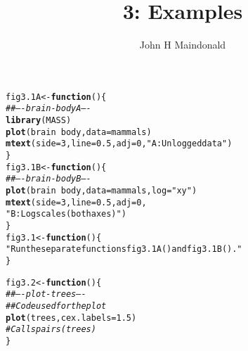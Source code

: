 \documentclass[12pt, a4paper,  BCOR=8.25mm, DIV=15]{scrartcl}\usepackage[]{graphicx}\usepackage[]{color}
\makeatletter
\newcommand{\hlnum}[1]{\textcolor[rgb]{0.686,0.059,0.569}{#1}}%
\newcommand{\hlstr}[1]{\textcolor[rgb]{0.192,0.494,0.8}{#1}}%
\newcommand{\hlcom}[1]{\textcolor[rgb]{0.678,0.584,0.686}{\textit{#1}}}%
\newcommand{\hlopt}[1]{\textcolor[rgb]{0,0,0}{#1}}%
\newcommand{\hlstd}[1]{\textcolor[rgb]{0.345,0.345,0.345}{#1}}%
\newcommand{\hlkwa}[1]{\textcolor[rgb]{0.161,0.373,0.58}{\textbf{#1}}}%
\newcommand{\hlkwb}[1]{\textcolor[rgb]{0.69,0.353,0.396}{#1}}%
\newcommand{\hlkwc}[1]{\textcolor[rgb]{0.333,0.667,0.333}{#1}}%
\newcommand{\hlkwd}[1]{\textcolor[rgb]{0.737,0.353,0.396}{\textbf{#1}}}%
\newenvironment{kframe}{%
 \def\at@end@of@kframe{}%
 \ifinner\ifhmode%
  \def\at@end@of@kframe{\end{minipage}}%
  \begin{minipage}{\columnwidth}%
 \fi\fi%
 \def\FrameCommand##1{\hskip\@totalleftmargin \hskip-\fboxsep
 \colorbox{shadecolor}{##1}\hskip-\fboxsep
     \hskip-\linewidth \hskip-\@totalleftmargin \hskip\columnwidth}%
 \MakeFramed {\advance\hsize-\width
   \@totalleftmargin\z@ \linewidth\hsize
   \@setminipage}}%
 {\par\unskip\endMakeFramed%
 \at@end@of@kframe}
\newenvironment{knitrout}{}{} %
\makeatother
\begin{document}



\title{3: Examples}
\author{John H Maindonald}
\maketitle

\begin{knitrout}
\color{fgcolor}\begin{kframe}
\begin{alltt}
\hlstd{fig3.1A} \hlkwb{<-} \hlkwa{function}\hlstd{()\{}
\hlcom{## ---- brain-bodyA ----}
\hlkwd{library}\hlstd{(MASS)}
\hlkwd{plot}\hlstd{(brain} \hlopt{~} \hlstd{body,} \hlkwc{data}\hlstd{=mammals)}
\hlkwd{mtext}\hlstd{(}\hlkwc{side}\hlstd{=}\hlnum{3}\hlstd{,} \hlkwc{line}\hlstd{=}\hlnum{0.5}\hlstd{,} \hlkwc{adj}\hlstd{=}\hlnum{0}\hlstd{,} \hlstr{"A: Unlogged data"}\hlstd{)}
\hlstd{\}}
\hlstd{fig3.1B} \hlkwb{<-} \hlkwa{function}\hlstd{()\{}
\hlcom{## ---- brain-bodyB ----}
\hlkwd{plot}\hlstd{(brain} \hlopt{~} \hlstd{body,} \hlkwc{data}\hlstd{=mammals,} \hlkwc{log}\hlstd{=}\hlstr{"xy"}\hlstd{)}
\hlkwd{mtext}\hlstd{(}\hlkwc{side}\hlstd{=}\hlnum{3}\hlstd{,} \hlkwc{line}\hlstd{=}\hlnum{0.5}\hlstd{,} \hlkwc{adj}\hlstd{=}\hlnum{0}\hlstd{,}
      \hlstr{"B: Log scales (both axes)"}\hlstd{)}
\hlstd{\}}
\hlstd{fig3.1} \hlkwb{<-} \hlkwa{function}\hlstd{()\{}
\hlstr{"Run the separate functions fig3.1A() and fig3.1B()."}
\hlstd{\}}
\end{alltt}
\end{kframe}
\end{knitrout}

\begin{knitrout}
\color{fgcolor}\begin{kframe}
\begin{alltt}
\hlstd{fig3.2} \hlkwb{<-} \hlkwa{function}\hlstd{()\{}
\hlcom{## ---- plot-trees ----}
\hlcom{## Code used for the plot}
\hlkwd{plot}\hlstd{(trees,} \hlkwc{cex.labels}\hlstd{=}\hlnum{1.5}\hlstd{)}
  \hlcom{# Calls pairs(trees)}
\hlstd{\}}
\end{alltt}
\end{kframe}
\end{knitrout}
\end{document}

